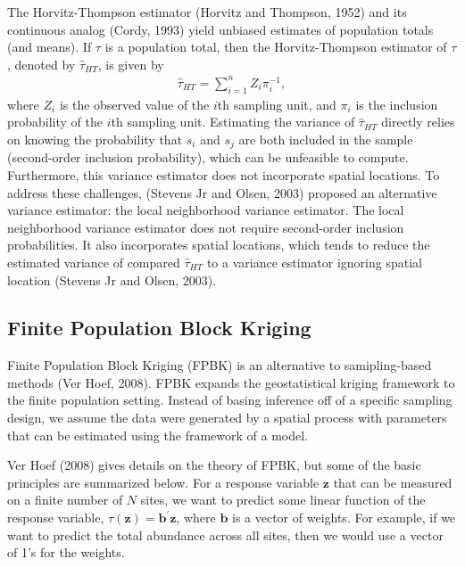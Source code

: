\documentclass[]{elsarticle} %
\begin{document}
The Horvitz-Thompson estimator (Horvitz and Thompson, 1952) and its
continuous analog (Cordy, 1993) yield unbiased estimates of population
totals (and means). If \(\tau\) is a population total, then the
Horvitz-Thompson estimator of \(\tau\), denoted by \(\hat{\tau}_{HT}\),
is given by \begin{align}\label{eq:htest}
  \hat{\tau}_{HT} = \sum_{i = 1}^n Z_i \pi_i^{-1},
\end{align} where \(Z_i\) is the observed value of the \(i\)th sampling
unit, and \(\pi_i\) is the inclusion probability of the \(i\)th sampling
unit. Estimating the variance of \(\hat{\tau}_{HT}\) directly relies on
knowing the probability that \(s_i\) and \(s_j\) are both included in
the sample (second-order inclusion probability), which can be unfeasible
to compute. Furthermore, this variance estimator does not incorporate
spatial locations. To address these challenges, (Stevens Jr and Olsen,
2003) proposed an alternative variance estimator: the local neighborhood
variance estimator. The local neighborhood variance estimator does not
require second-order inclusion probabilities. It also incorporates
spatial locations, which tends to reduce the estimated variance of
compared \(\hat{\tau}_{HT}\) to a variance estimator ignoring spatial
location (Stevens Jr and Olsen, 2003).

\hypertarget{finite-population-block-kriging}{%
\subsection{Finite Population Block
Kriging}\label{finite-population-block-kriging}}

Finite Population Block Kriging (FPBK) is an alternative to
samipling-based methods (Ver Hoef, 2008). FPBK expands the
geostatistical kriging framework to the finite population setting.
Instead of basing inference off of a specific sampling design, we assume
the data were generated by a spatial process with parameters that can be
estimated using the framework of a model.

Ver Hoef (2008) gives details on the theory of FPBK, but some of the
basic principles are summarized below. For a response variable
\(\mathbf{z}\) that can be measured on a finite number of \(N\) sites,
we want to predict some linear function of the response variable,
\(\tau(\mathbf{z}) = \mathbf{b}^\prime \mathbf{z}\), where
\(\mathbf{b}\) is a vector of weights. For example, if we want to
predict the total abundance across all sites, then we would use a vector
of 1's for the weights.
\end{document}
